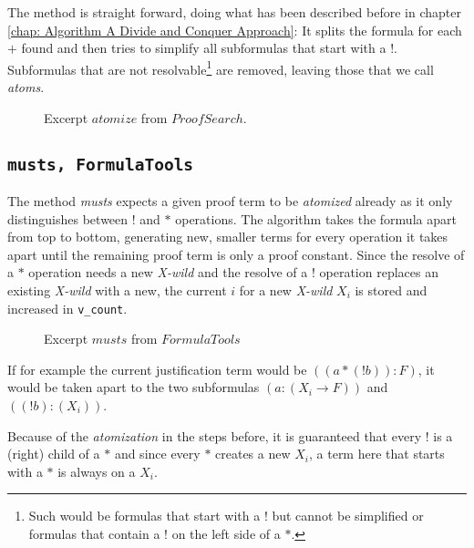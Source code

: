The method is straight forward, doing what has been described before in chapter \ref{chap: Algorithm A Divide and Conquer Approach}: It splits the formula for each $+$ found and then tries to simplify all subformulas that start with a $!$. Subformulas that are not resolvable\footnote{Such would be formulas that start with a $!$ but cannot be simplified or formulas that contain a $!$ on the left side of a $*$.} are removed, leaving those that we call \emph{atoms}.

\begin{figure}[H]
    \vspace{-10pt}
	
	\vspace{-10pt}
	\caption{Excerpt $atomize$ from $ProofSearch$.}
	\vspace{-10pt}
\end{figure}

\subsection[musts]{\texttt{musts, FormulaTools}}
The method \emph{musts} expects a given proof term to be \emph{atomized} already as it only distinguishes between $!$ and $*$ operations.
The algorithm takes the formula apart from top to bottom, generating new, smaller terms for every operation it takes apart until the remaining proof term is only a proof constant. Since the resolve of a $*$ operation needs a new \emph{X-wild} and the resolve of a $!$ operation replaces an existing \emph{X-wild} with a new, the current $i$ for a new \emph{X-wild} $X_i$ is stored and increased in \texttt{v\_count}.

\begin{figure}[H]
    \vspace{-10pt}
	
	\vspace{-10pt}
	\caption{Excerpt $musts$ from $FormulaTools$}
	\vspace{-10pt}
\end{figure}

If for example the current justification term would be $((a*(!b)):F)$, it would be taken apart to the two subformulas $(a:(X_i\rightarrow F))$ and $((!b):(X_i))$.

Because of the \emph{atomization} in the steps before, it is guaranteed that every $!$ is a (right) child of a  $*$ and since every $*$ creates a new $X_i$, a term here that starts with a $*$ is always on a $X_i$. 

